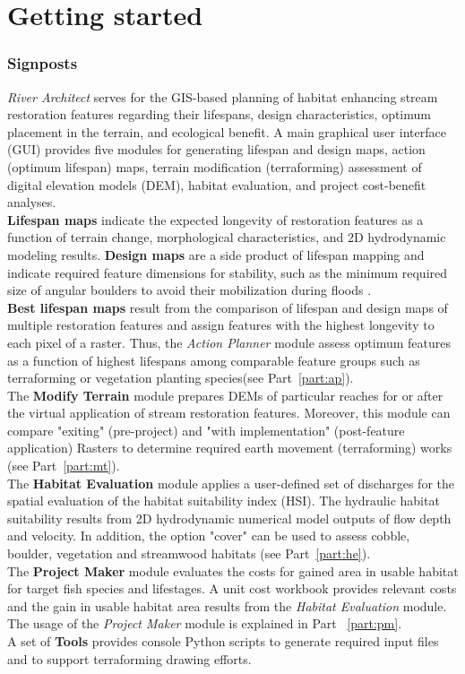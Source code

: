 \part{Getting started}
\section{Signposts}
\textit{River Architect} serves for the GIS-based planning of habitat enhancing stream restoration features regarding their lifespans, design characteristics, optimum placement in the terrain, and ecological benefit. A main graphical user interface (GUI) provides five modules for generating lifespan and design maps, action (optimum lifespan) maps, terrain modification (terraforming) assessment of digital elevation models (DEM), habitat evaluation, and project cost-benefit analyses.\\

\textbf{Lifespan maps} indicate the expected longevity of restoration features as a function of terrain change, morphological characteristics, and 2D hydrodynamic modeling results. \textbf{Design maps} are a side product of lifespan mapping and indicate required feature dimensions for stability, such as the minimum required size of angular boulders to avoid their mobilization during floods \citep[see Part~\ref{part:lf} and ][]{schwindt19a}.\\
\textbf{Best lifespan maps} result from the comparison of lifespan and design maps of multiple restoration features and assign features with the highest longevity to each pixel of a raster. Thus, the \textit{Action Planner} module assess optimum features as a function of highest lifespans among comparable feature groups such as terraforming or vegetation planting species(see Part~\ref{part:ap}).\\
The \textbf{Modify Terrain} module prepares DEMs of particular reaches for or after the virtual application of stream restoration features. Moreover, this module can compare "exiting" (pre-project) and "with implementation" (post-feature application) Rasters to determine required earth movement (terraforming) works (see Part~\ref{part:mt}).\\
The \textbf{Habitat Evaluation} module applies a user-defined set of discharges for the spatial evaluation of the habitat suitability index (HSI). The hydraulic habitat suitability results from 2D hydrodynamic numerical model outputs of flow depth and velocity. In addition, the option "cover" can be used to assess cobble, boulder, vegetation and streamwood habitats (see Part~\ref{part:he}).\\
The \textbf{Project Maker} module evaluates the costs for gained area in usable habitat for target fish species and lifestages. A unit cost workbook provides relevant costs and the gain in usable habitat area results from the \textit{Habitat Evaluation} module. The usage of the \textit{Project Maker} module is explained in Part ~\ref{part:pm}.\\
A set of \textbf{Tools} provides console Python scripts to generate required input files and to support terraforming drawing efforts.\\

